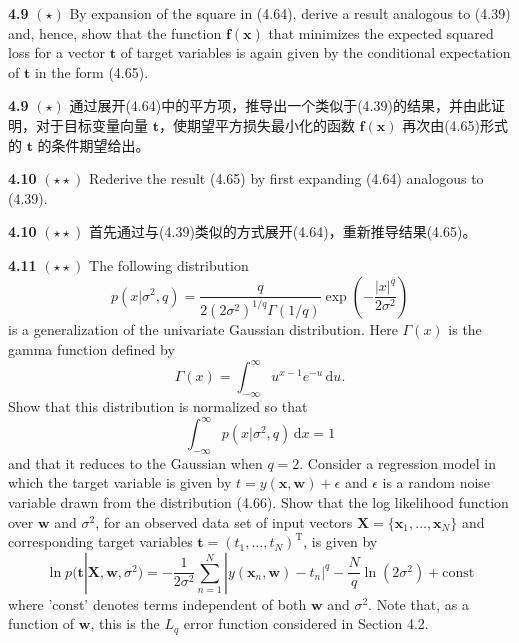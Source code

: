 \documentclass{article}
\begin{document}
\textbf{4.9} $(\star)$ By expansion of the square in (4.64), derive a result analogous to (4.39) and, hence, show that the function $\mathbf{f}(\mathbf{x})$ that minimizes the expected squared loss for a vector $\mathbf{t}$ of target variables is again given by the conditional expectation of $\mathbf{t}$ in the form (4.65).

\textbf{4.9} $(\star)$ 通过展开(4.64)中的平方项，推导出一个类似于(4.39)的结果，并由此证明，对于目标变量向量 $\mathbf{t}$，使期望平方损失最小化的函数 $\mathbf{f}(\mathbf{x})$ 再次由(4.65)形式的 $\mathbf{t}$ 的条件期望给出。


\textbf{4.10} $(\star\star)$ Rederive the result (4.65) by first expanding (4.64) analogous to (4.39).

\textbf{4.10} $(\star\star)$ 首先通过与(4.39)类似的方式展开(4.64)，重新推导结果(4.65)。


\textbf{4.11} $(\star\star)$ The following distribution
\begin{equation}
p(x|\sigma^2, q) = \frac{q}{2(2\sigma^2)^{1/q}\Gamma(1/q)} \exp\left(-\frac{|x|^q}{2\sigma^2}\right) \tag{4.66}
\end{equation}
is a generalization of the univariate Gaussian distribution. Here $\Gamma(x)$ is the gamma function defined by
\begin{equation}
\Gamma(x) = \int_{-\infty}^{\infty} u^{x-1} e^{-u} \,\mathrm{d}u. \tag{4.67}
\end{equation}
Show that this distribution is normalized so that
\begin{equation}
\int_{-\infty}^{\infty} p(x|\sigma^2, q) \,\mathrm{d}x = 1 \tag{4.68}
\end{equation}
and that it reduces to the Gaussian when $q = 2$. Consider a regression model in which the target variable is given by $t = y(\mathbf{x}, \mathbf{w}) + \epsilon$ and $\epsilon$ is a random noise variable drawn from the distribution (4.66). Show that the log likelihood function over $\mathbf{w}$ and $\sigma^2$, for an observed data set of input vectors $\mathbf{X} = \{\mathbf{x}_1, \dots, \mathbf{x}_N\}$ and corresponding target variables $\mathbf{t} = (t_1, \dots, t_N)^{\mathrm{T}}$, is given by
\begin{equation}
\ln p(\mathbf{t}|\mathbf{X}, \mathbf{w}, \sigma^2) = -\frac{1}{2\sigma^2} \sum_{n=1}^{N} |y(\mathbf{x}_n, \mathbf{w}) - t_n|^q - \frac{N}{q} \ln(2\sigma^2) + \text{const} \tag{4.69}
\end{equation}
where 'const' denotes terms independent of both $\mathbf{w}$ and $\sigma^2$. Note that, as a function of $\mathbf{w}$, this is the $L_q$ error function considered in Section 4.2.
\end{document}
